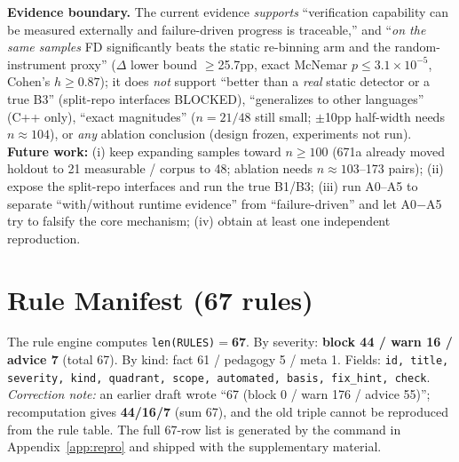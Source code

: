 \documentclass{article}
\begin{document}
\textbf{Evidence boundary.} The current evidence \emph{supports} ``verification capability can be
measured externally and failure-driven progress is traceable,'' and ``\emph{on the same samples}
FD significantly beats the static re-binning arm and the random-instrument proxy'' ($\Delta$
lower bound $\ge$25.7pp, exact McNemar $p\le3.1\times10^{-5}$, Cohen's $h\ge0.87$); it does
\emph{not} support ``better than a \emph{real} static detector or a true B3'' (split-repo
interfaces BLOCKED), ``generalizes to other languages'' (C++ only), ``exact magnitudes''
($n{=}21/48$ still small; $\pm$10pp half-width needs $n\approx104$), or \emph{any} ablation
conclusion (design frozen, experiments not run). \textbf{Future work:} (i) keep expanding samples
toward $n\ge100$ (671a already moved holdout to 21 measurable / corpus to 48; ablation needs
$n\approx103$--173 pairs); (ii) expose the split-repo interfaces and run the true B1/B3;
(iii) run A0--A5 to separate ``with/without runtime evidence'' from ``failure-driven'' and let
A0$-$A5 try to falsify the core mechanism; (iv) obtain at least one independent reproduction.

\label{page:endmain}%



\newpage
\appendix
\section{Rule Manifest (67 rules)}
\label{app:rules}
The rule engine computes \texttt{len(RULES)}$=$\textbf{67}. By severity: \textbf{block 44 / warn 16
/ advice 7} (total 67). By kind: fact 61 / pedagogy 5 / meta 1. Fields:
\texttt{id, title, severity, kind, quadrant, scope, automated, basis, fix\_hint, check}.
\emph{Correction note:} an earlier draft wrote ``67 (block 0 / warn 176 / advice 55)''; recomputation
gives \textbf{44/16/7} (sum 67), and the old triple cannot be reproduced from the rule table. The
full 67-row list is generated by the command in Appendix~\ref{app:repro} and shipped with the
supplementary material.
\end{document}
